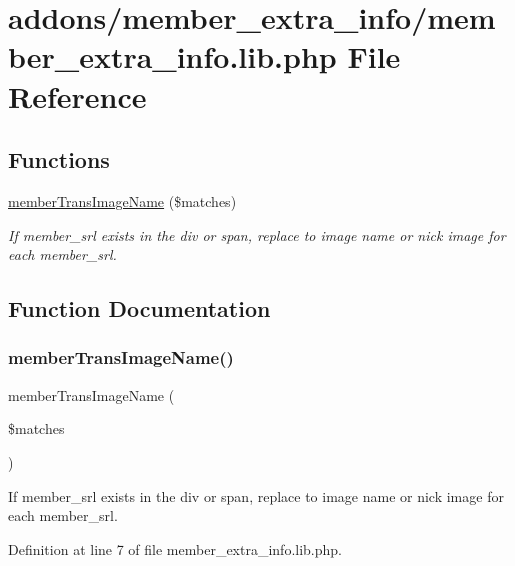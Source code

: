 \hypertarget{member__extra__info_8lib_8php}{}\section{addons/member\+\_\+extra\+\_\+info/member\+\_\+extra\+\_\+info.lib.\+php File Reference}
\label{member__extra__info_8lib_8php}
\subsection*{Functions}
\begin{DoxyCompactItemize}
\item 
\hyperlink{member__extra__info_8lib_8php_a21882e797e0da66aed32f1cf3053eaf2}{member\+Trans\+Image\+Name} (\$matches)
\begin{DoxyCompactList}\small\item\em If member\+\_\+srl exists in the div or span, replace to image name or nick image for each member\+\_\+srl. \end{DoxyCompactList}\end{DoxyCompactItemize}


\subsection{Function Documentation}
\mbox{\label{member__extra__info_8lib_8php_a21882e797e0da66aed32f1cf3053eaf2}} 
\subsubsection{\texorpdfstring{member\+Trans\+Image\+Name()}{memberTransImageName()}}
{\footnotesize\ttfamily member\+Trans\+Image\+Name (\begin{DoxyParamCaption}\item[{}]{\$matches }\end{DoxyParamCaption})}



If member\+\_\+srl exists in the div or span, replace to image name or nick image for each member\+\_\+srl. 



Definition at line 7 of file member\+\_\+extra\+\_\+info.\+lib.\+php.

